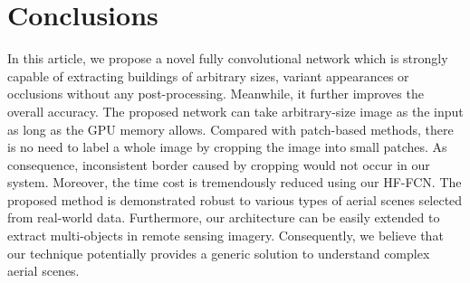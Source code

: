 \documentclass[runningheads]{llncs}
\begin{document}
\section{Conclusions}
\label{section:conclusions}
   In  this article, we propose a novel fully convolutional network which is  strongly capable of extracting buildings of arbitrary sizes, variant appearances or occlusions without any post-processing. Meanwhile, it further improves the overall accuracy. The proposed network can take arbitrary-size image as the input as long as the GPU memory allows. Compared with patch-based methods, there is no need to label a whole image by cropping the image into small patches. As consequence, inconsistent border caused by cropping would not occur in our system. Moreover, the time cost is tremendously reduced using our HF-FCN. 
   The proposed method is demonstrated robust to various types of aerial scenes selected from real-world data. Furthermore, our architecture can be easily extended to extract multi-objects in remote sensing imagery. 
   Consequently, we believe that our technique potentially provides a generic solution to understand complex aerial scenes.
	



\end{document}
